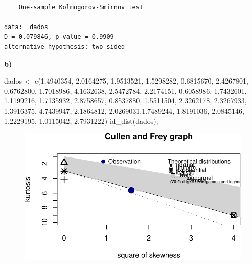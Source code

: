 \documentclass[
  letterpaper,
  DIV=11,
  numbers=noendperiod]{scrartcl}
\newenvironment{Shaded}{\begin{snugshade}}{\end{snugshade}}
\newcommand{\FloatTok}[1]{\textcolor[rgb]{0.68,0.00,0.00}{#1}}
\newcommand{\FunctionTok}[1]{\textcolor[rgb]{0.28,0.35,0.67}{#1}}
\newcommand{\NormalTok}[1]{\textcolor[rgb]{0.00,0.23,0.31}{#1}}
\newcommand{\OtherTok}[1]{\textcolor[rgb]{0.00,0.23,0.31}{#1}}
\begin{document}
\begin{verbatim}

    One-sample Kolmogorov-Smirnov test

data:  dados
D = 0.079846, p-value = 0.9909
alternative hypothesis: two-sided
\end{verbatim}

\textbf{b)}

\begin{Shaded}
\begin{Highlighting}[]
\NormalTok{dados }\OtherTok{\textless{}{-}} \FunctionTok{c}\NormalTok{(}\FloatTok{1.4940354}\NormalTok{, }\FloatTok{2.0164275}\NormalTok{, }\FloatTok{1.9513521}\NormalTok{, }\FloatTok{1.5298282}\NormalTok{, }\FloatTok{0.6815670}\NormalTok{, }\FloatTok{2.4267801}\NormalTok{, }\FloatTok{0.6762800}\NormalTok{, }\FloatTok{1.7018986}\NormalTok{, }\FloatTok{4.1632638}\NormalTok{, }\FloatTok{2.5472784}\NormalTok{, }\FloatTok{2.2174151}\NormalTok{, }\FloatTok{0.6058986}\NormalTok{, }\FloatTok{1.7432601}\NormalTok{, }\FloatTok{1.1199216}\NormalTok{, }\FloatTok{1.7135932}\NormalTok{, }\FloatTok{2.8758657}\NormalTok{, }\FloatTok{0.8537880}\NormalTok{, }\FloatTok{1.5511504}\NormalTok{, }\FloatTok{2.3262178}\NormalTok{, }\FloatTok{2.3267933}\NormalTok{, }\FloatTok{1.3916375}\NormalTok{, }\FloatTok{4.7439947}\NormalTok{, }\FloatTok{2.1864812}\NormalTok{, }\FloatTok{2.0269031}\NormalTok{,}\FloatTok{1.7489244}\NormalTok{, }\FloatTok{1.8191036}\NormalTok{, }\FloatTok{2.0845146}\NormalTok{, }\FloatTok{1.2229195}\NormalTok{, }\FloatTok{1.0115042}\NormalTok{, }\FloatTok{2.7931222}\NormalTok{)}
\FunctionTok{id\_dist}\NormalTok{(dados);}
\end{Highlighting}
\end{Shaded}

\begin{figure}[H]

{\centering \includegraphics{quiz5_files/figure-pdf/unnamed-chunk-33-1.pdf}

}

\end{figure}
\end{document}
